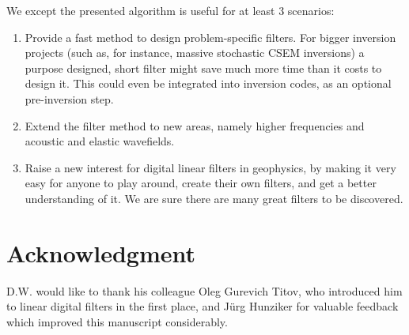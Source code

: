 \documentclass[paper,twocolumn,twoside]{geophysics}
\begin{document}
We except the presented algorithm is useful for at least 3 scenarios:
\begin{enumerate}
  \item Provide a fast method to design problem-specific filters. For bigger
    inversion projects (such as, for instance, massive stochastic CSEM
    inversions) a purpose designed, short filter might save much more time than
    it costs to design it. This could even be integrated into inversion codes,
    as an optional pre-inversion step.
  \item Extend the filter method to new areas, namely higher frequencies and
    acoustic and elastic wavefields.
  \item Raise a new interest for digital linear filters in geophysics, by
    making it very easy for anyone to play around, create their own filters,
    and get a better understanding of it. We are sure there are many great
    filters to be discovered.
\end{enumerate}

\section{Acknowledgment}
D.W. would like to thank his colleague Oleg Gurevich Titov, who introduced him
to linear digital filters in the first place, and Jürg Hunziker for valuable
feedback which improved this manuscript considerably.
\end{document}
